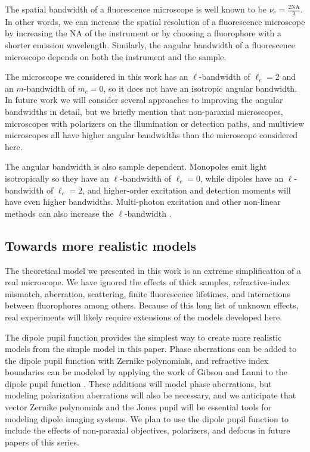 \documentclass[]{osa-article}
\begin{document}
The spatial bandwidth of a fluorescence microscope is well known to be
$\nu_c = \frac{2\text{NA}}{\lambda}$. In other words, we can increase the
spatial resolution of a fluorescence microscope by increasing the NA of the
instrument or by choosing a fluorophore with a shorter emission wavelength.
Similarly, the angular bandwidth of a fluorescence microscope depends on both
the instrument and the sample.

The microscope we considered in this work has an $\ell$-bandwidth of $\ell_c = 2$
and an $m$-bandwidth of $m_c = 0$, so it does not have an isotropic angular
bandwidth. In future work we will consider several approaches to improving the
angular bandwidths in detail, but we briefly mention that non-paraxial
microscopes, microscopes with polarizers on the illumination or detection paths,
and multiview microscopes all have higher angular bandwidths than the microscope
considered here.

The angular bandwidth is also sample dependent. Monopoles emit light
isotropically so they have an $\ell$-bandwidth of $\ell_c = 0$, while dipoles
have an $\ell$-bandwidth of $\ell_c = 2$, and higher-order excitation and
detection moments will have even higher bandwidths. Multi-photon excitation and
other non-linear methods can also increase the $\ell$-bandwidth
\cite{brasselet2011}.

\subsection{Towards more realistic models}
The theoretical model we presented in this work is an extreme simplification of
a real microscope. We have ignored the effects of thick samples,
refractive-index mismatch, aberration, scattering, finite fluorescence
lifetimes, and interactions between fluorophores among others. Because of this
long list of unknown effects, real experiments will likely require extensions of
the models developed here.

The dipole pupil function provides the simplest way to create more realistic
models from the simple model in this paper. Phase aberrations can be added to
the dipole pupil function with Zernike polynomials, and refractive index
boundaries can be modeled by applying the work of Gibson and Lanni to the dipole
pupil function \cite{gibson89}. These additions will model phase aberrations,
but modeling polarization aberrations will also be necessary, and we anticipate
that vector Zernike polynomials and the Jones pupil \cite{zhao2007, xu2015,
  chipman1989} will be essential tools for modeling dipole imaging systems. We
plan to use the dipole pupil function to include the effects of non-paraxial
objectives, polarizers, and defocus in future papers of this series.
\end{document}
